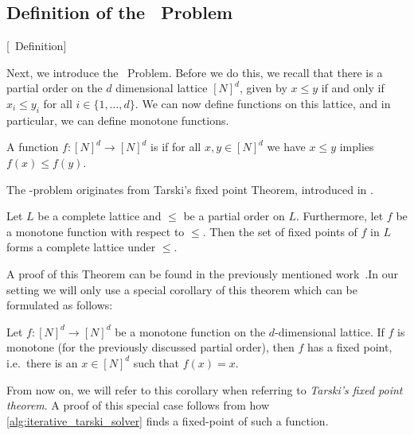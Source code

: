 \subsection{Definition of the \Tarski\ Problem}[\Tarski\ Definition]

Next, we introduce the \Tarski\ Problem. Before we do this, we recall that there is a partial order on the $d$ dimensional lattice ${[N]}^d$, given by $x \leq y$ if and only if $x_i \leq y_i$ for all $i \in \{1, \dots, d\}$. We can now define functions on this lattice, and in particular, we can define monotone functions.

\begin{definition}
	A function $f : {[N]}^d \rightarrow {[N]}^d$ is  if for all $x, y \in {[N]}^d$ we have $x \leq y$ implies $f(x) \leq f(y)$.
\end{definition}

The \Tarski-problem originates from Tarski's fixed point Theorem, introduced in .

\begin{theorem}
	Let $L$ be a complete lattice and $\leq$ be a partial order on $L$. Furthermore, let $f$ be a monotone function with respect to $\leq$. Then the set of fixed points of $f$ in $L$ forms a complete lattice under $\leq$.
\end{theorem}

A proof of this Theorem can be found in the previously mentioned work~\cite{tarski_lattice-theoretical_1955}.In our setting we will only use a special corollary of this theorem which can be formulated as follows:

\begin{corollary}
	Let $f : {[N]}^d \rightarrow {[N]}^d$ be a monotone function on the $d$-dimensional lattice. If $f$ is monotone (for the previously discussed partial order), then $f$ has a fixed point, i.e.\ there is an $x \in {[N]}^d$ such that $f(x)=x$.
\end{corollary}

From now on, we will refer to this corollary when referring to \emph{Tarski's fixed point theorem}. A proof of this special case follows from how \cref{alg:iterative_tarski_solver} finds a fixed-point of such a function.

